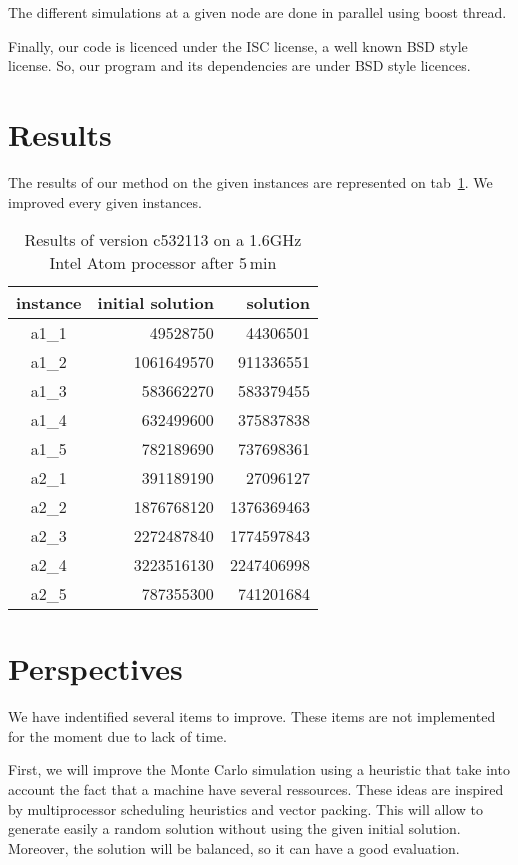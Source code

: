 \documentclass[a4paper,twocolumn]{article}
\begin{document}
The different simulations at a given node are done in parallel using
boost thread.

Finally, our code is licenced under the ISC license, a well known BSD
style license.  So, our program and its dependencies are under BSD
style licences.

\section{Results}

The results of our method on the given instances are represented on
tab~\ref{tab:results}.  We improved every given instances.

\begin{table}
  \centering
  \label{tab:results}
  \caption{Results of version c532113 on a 1.6GHz Intel Atom processor
    after 5\,min}
  \begin{tabular}{|c|r|r|}
    \hline
    instance & initial solution & solution\\
    \hline
    a1\_1 &   49528750 &   44306501\\
    a1\_2 & 1061649570 &  911336551\\
    a1\_3 &  583662270 &  583379455\\
    a1\_4 &  632499600 &  375837838\\
    a1\_5 &  782189690 &  737698361\\
    a2\_1 &  391189190 &   27096127\\
    a2\_2 & 1876768120 & 1376369463\\
    a2\_3 & 2272487840 & 1774597843\\
    a2\_4 & 3223516130 & 2247406998\\
    a2\_5 &  787355300 &  741201684\\
    \hline
  \end{tabular}
\end{table}

\section{Perspectives}

We have indentified several items to improve. These items are not
implemented for the moment due to lack of time.

First, we will improve the Monte Carlo simulation using a heuristic
that take into account the fact that a machine have several
ressources.  These ideas are inspired by multiprocessor scheduling
heuristics and vector packing.  This will allow to generate easily a
random solution without using the given initial solution. Moreover,
the solution will be balanced, so it can have a good evaluation.
\end{document}
